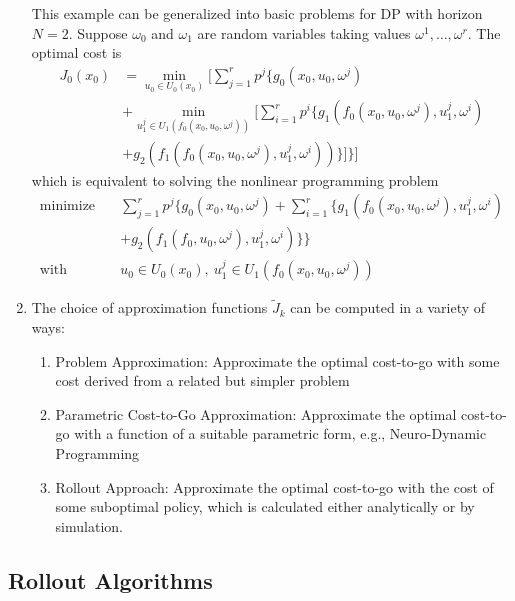 \begin{enumerate}
\begin{example}
\end{example}
This example can be generalized into basic problems for DP with horizon $N=2$.
Suppose $\omega_0$ and $\omega_1$ are random variables taking values $\omega^1,\dots,\omega^r$.
The optimal cost is 
\begin{align*}
J_0(x_0)&=\min_{u_0\in U_0(x_0)}
\Bigg[
\sum_{j=1}^rp^j\Bigg\{
g_0(x_0,u_0,\omega^j)\\
&+
\min_{u_1^j\in U_1(f_0(x_0,u_0,\omega^j))}\Bigg[
\sum_{i=1}^rp^i\Bigg\{ g_1(f_0(x_0,u_0,\omega^j), u_1^j,\omega^i)\\
&+g_2(f_1(f_0(x_0,u_0,\omega^j), u_1^j,\omega^i))\Bigg\}\Bigg]\Bigg\}\Bigg]
\end{align*}
which is equivalent to solving the nonlinear programming problem
\begin{align*}
\text{minimize}\quad&\sum_{j=1}^rp^j\Bigg\{g_0(x_0,u_0,\omega^j)+\sum_{i=1}^r\Bigg\{g_1(f_0(x_0,u_0,\omega^j),u_1^j,\omega^i)\\
&+g_2(f_1(f_0,u_0,\omega^j),u_1^j,\omega^i)\Bigg\}\Bigg\}\\
\text{with}\quad&u_0\in U_0(x_0),\ u_1^j\in U_1(f_0(x_0,u_0,\omega^j))
\end{align*}
\item
The choice of approximation functions $\tilde{J}_k$ can be computed in a variety of ways:
\begin{enumerate}
\item
Problem Approximation:
Approximate the optimal cost-to-go with some cost derived from a related but simpler problem
\item
Parametric Cost-to-Go Approximation:
Approximate the optimal cost-to-go with a function of a suitable parametric form, e.g., Neuro-Dynamic Programming
\item
Rollout Approach: Approximate the optimal cost-to-go with the cost of some suboptimal policy, 
which is calculated either analytically or by simulation.

\end{enumerate}


\end{enumerate}

\subsection{Rollout Algorithms}
